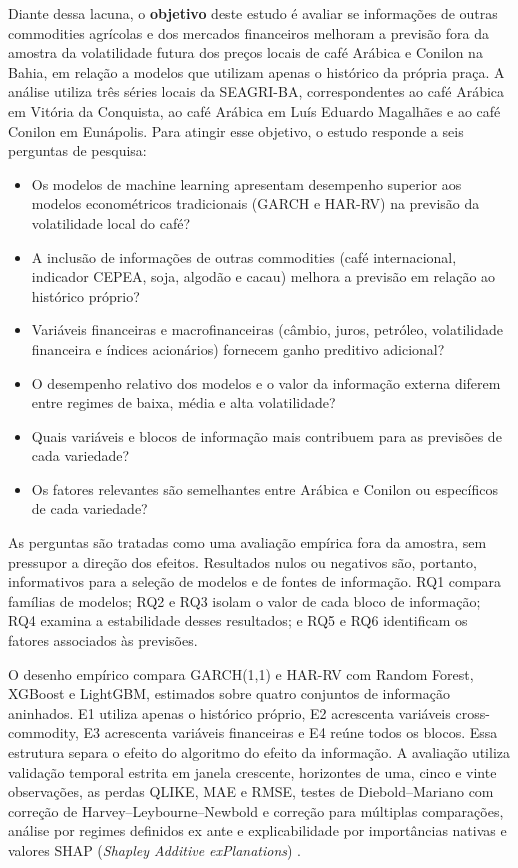 \documentclass[a4paper,fleqn]{cas-sc}
\begin{document}
Diante dessa lacuna, o \textbf{objetivo} deste estudo é avaliar se informações de outras commodities agrícolas e dos mercados financeiros melhoram a previsão fora da amostra da volatilidade futura dos preços locais de café Arábica e Conilon na Bahia, em relação a modelos que utilizam apenas o histórico da própria praça. A análise utiliza três séries locais da SEAGRI-BA, correspondentes ao café Arábica em Vitória da Conquista, ao café Arábica em Luís Eduardo Magalhães e ao café Conilon em Eunápolis. Para atingir esse objetivo, o estudo responde a seis perguntas de pesquisa:

\begin{itemize}
\item[\textbf{RQ1.}] Os modelos de machine learning apresentam desempenho superior aos modelos econométricos tradicionais (GARCH e HAR-RV) na previsão da volatilidade local do café?
\item[\textbf{RQ2.}] A inclusão de informações de outras commodities (café internacional, indicador CEPEA, soja, algodão e cacau) melhora a previsão em relação ao histórico próprio?
\item[\textbf{RQ3.}] Variáveis financeiras e macrofinanceiras (câmbio, juros, petróleo, volatilidade financeira e índices acionários) fornecem ganho preditivo adicional?
\item[\textbf{RQ4.}] O desempenho relativo dos modelos e o valor da informação externa diferem entre regimes de baixa, média e alta volatilidade?
\item[\textbf{RQ5.}] Quais variáveis e blocos de informação mais contribuem para as previsões de cada variedade?
\item[\textbf{RQ6.}] Os fatores relevantes são semelhantes entre Arábica e Conilon ou específicos de cada variedade?
\end{itemize}

As perguntas são tratadas como uma avaliação empírica fora da amostra, sem pressupor a direção dos efeitos. Resultados nulos ou negativos são, portanto, informativos para a seleção de modelos e de fontes de informação. RQ1 compara famílias de modelos; RQ2 e RQ3 isolam o valor de cada bloco de informação; RQ4 examina a estabilidade desses resultados; e RQ5 e RQ6 identificam os fatores associados às previsões.

O desenho empírico compara GARCH(1,1) e HAR-RV com Random Forest, XGBoost e LightGBM, estimados sobre quatro conjuntos de informação aninhados. E1 utiliza apenas o histórico próprio, E2 acrescenta variáveis cross-commodity, E3 acrescenta variáveis financeiras e E4 reúne todos os blocos. Essa estrutura separa o efeito do algoritmo do efeito da informação. A avaliação utiliza validação temporal estrita em janela crescente, horizontes de uma, cinco e vinte observações, as perdas QLIKE, MAE e RMSE, testes de Diebold--Mariano com correção de Harvey--Leybourne--Newbold e correção para múltiplas comparações, análise por regimes definidos ex ante e explicabilidade por importâncias nativas e valores SHAP (\textit{Shapley Additive exPlanations}) \citep{Wang2024SystemicRiskML,Diachkov2026FinancialStressML}.
\end{document}
